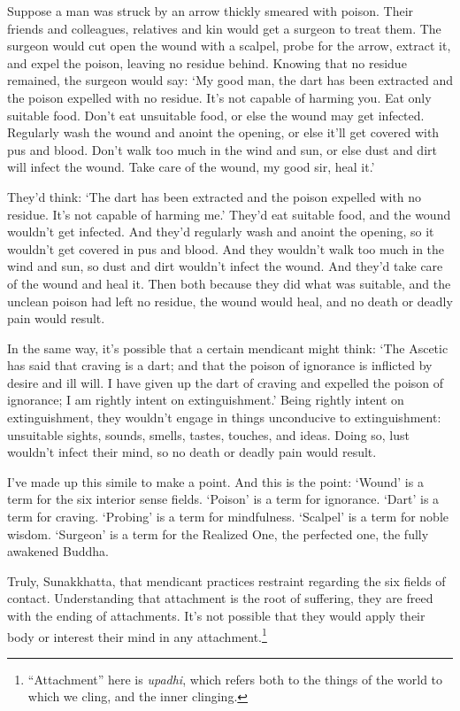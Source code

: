 \documentclass[12pt,openany]{book}%
\begin{document}
Suppose a man was struck by an arrow thickly smeared with poison. Their friends and colleagues, relatives and kin would get a surgeon to treat them. The surgeon would cut open the wound with a scalpel, probe for the arrow, extract it, and expel the poison, leaving no residue behind. Knowing that no residue remained, the surgeon would say: ‘My good man, the dart has been extracted and the poison expelled with no residue. It’s not capable of harming you. Eat only suitable food. Don’t eat unsuitable food, or else the wound may get infected. Regularly wash the wound and anoint the opening, or else it’ll get covered with pus and blood. Don’t walk too much in the wind and sun, or else dust and dirt will infect the wound. Take care of the wound, my good sir, heal it.’ 

They’d think: ‘The dart has been extracted and the poison expelled with no residue. It’s not capable of harming me.’ They’d eat suitable food, and the wound wouldn’t get infected. And they’d regularly wash and anoint the opening, so it wouldn’t get covered in pus and blood. And they wouldn’t walk too much in the wind and sun, so dust and dirt wouldn’t infect the wound. And they’d take care of the wound and heal it. Then both because they did what was suitable, and the unclean poison had left no residue, the wound would heal, and no death or deadly pain would result. 

In the same way, it’s possible that a certain mendicant might think: ‘The Ascetic has said that craving is a dart; and that the poison of ignorance is inflicted by desire and ill will. I have given up the dart of craving and expelled the poison of ignorance; I am rightly intent on extinguishment.’ Being rightly intent on extinguishment, they wouldn’t engage in things unconducive to extinguishment: unsuitable sights, sounds, smells, tastes, touches, and ideas. Doing so, lust wouldn’t infect their mind, so no death or deadly pain would result. 

I’ve made up this simile to make a point. And this is the point: ‘Wound’ is a term for the six interior sense fields. ‘Poison’ is a term for ignorance. ‘Dart’ is a term for craving. ‘Probing’ is a term for mindfulness. ‘Scalpel’ is a term for noble wisdom. ‘Surgeon’ is a term for the Realized One, the perfected one, the fully awakened Buddha. 

Truly, Sunakkhatta, that mendicant practices restraint regarding the six fields of contact. Understanding that attachment is the root of suffering, they are freed with the ending of attachments. It’s not possible that they would apply their body or interest their mind in any attachment.\footnote{“Attachment” here is \textit{upadhi}, which refers both to the things of the world to which we cling, and the inner clinging. } 
\end{document}
